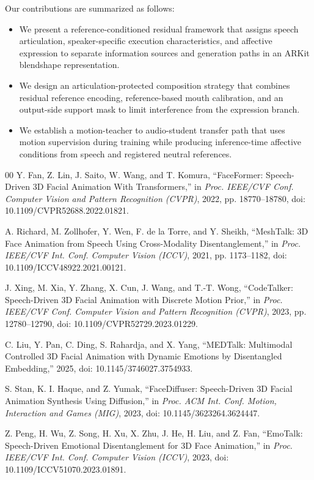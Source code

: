 \documentclass[conference]{IEEEtran}
\begin{document}
Our contributions are summarized as follows:
\begin{itemize}
  \item We present a reference-conditioned residual framework that assigns speech articulation, speaker-specific execution characteristics, and affective expression to separate information sources and generation paths in an ARKit blendshape representation.
  \item We design an articulation-protected composition strategy that combines residual reference encoding, reference-based mouth calibration, and an output-side support mask to limit interference from the expression branch.
  \item We establish a motion-teacher to audio-student transfer path that uses motion supervision during training while producing inference-time affective conditions from speech and registered neutral references.
\end{itemize}

\begin{thebibliography}{00}
 Y. Fan, Z. Lin, J. Saito, W. Wang, and T. Komura, ``FaceFormer: Speech-Driven 3D Facial Animation With Transformers,'' in \emph{Proc. IEEE/CVF Conf. Computer Vision and Pattern Recognition (CVPR)}, 2022, pp. 18770--18780, doi: 10.1109/CVPR52688.2022.01821.

 A. Richard, M. Zollhofer, Y. Wen, F. de la Torre, and Y. Sheikh, ``MeshTalk: 3D Face Animation from Speech Using Cross-Modality Disentanglement,'' in \emph{Proc. IEEE/CVF Int. Conf. Computer Vision (ICCV)}, 2021, pp. 1173--1182, doi: 10.1109/ICCV48922.2021.00121.

 J. Xing, M. Xia, Y. Zhang, X. Cun, J. Wang, and T.-T. Wong, ``CodeTalker: Speech-Driven 3D Facial Animation with Discrete Motion Prior,'' in \emph{Proc. IEEE/CVF Conf. Computer Vision and Pattern Recognition (CVPR)}, 2023, pp. 12780--12790, doi: 10.1109/CVPR52729.2023.01229.

 C. Liu, Y. Pan, C. Ding, S. Rahardja, and X. Yang, ``MEDTalk: Multimodal Controlled 3D Facial Animation with Dynamic Emotions by Disentangled Embedding,'' 2025, doi: 10.1145/3746027.3754933.

 S. Stan, K. I. Haque, and Z. Yumak, ``FaceDiffuser: Speech-Driven 3D Facial Animation Synthesis Using Diffusion,'' in \emph{Proc. ACM Int. Conf. Motion, Interaction and Games (MIG)}, 2023, doi: 10.1145/3623264.3624447.

 Z. Peng, H. Wu, Z. Song, H. Xu, X. Zhu, J. He, H. Liu, and Z. Fan, ``EmoTalk: Speech-Driven Emotional Disentanglement for 3D Face Animation,'' in \emph{Proc. IEEE/CVF Int. Conf. Computer Vision (ICCV)}, 2023, doi: 10.1109/ICCV51070.2023.01891.
\end{thebibliography}
\end{document}
